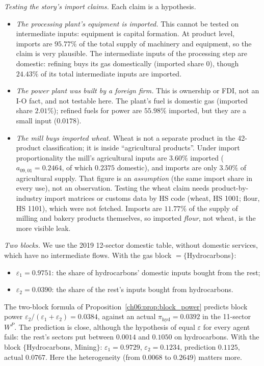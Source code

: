 \documentclass[../solutions_manual.tex]{subfiles}
\begin{document}
 \emph{Testing the story's import claims.} Each claim is a hypothesis.
\begin{itemize}
\item \emph{The processing plant's equipment is imported.} This cannot be tested on intermediate inputs: equipment is capital formation. At product level, imports are $95.77\%$ of the total supply of machinery and equipment, so the claim is very plausible. The intermediate inputs of the processing step are domestic: refining buys its gas domestically (imported share 0), though $24.43\%$ of its total intermediate inputs are imported.
\item \emph{The power plant was built by a foreign firm.} This is ownership or FDI, not an I-O fact, and not testable here. The plant's fuel is domestic gas (imported share $2.01\%$); refined fuels for power are $55.98\%$ imported, but they are a small input ($0.0178$).
\item \emph{The mill buys imported wheat.} Wheat is not a separate product in the 42-product classification; it is inside ``agricultural products''. Under import proportionality the mill's agricultural inputs are $3.60\%$ imported ($a_{09,01} = 0.2464$, of which $0.2375$ domestic), and imports are only $3.50\%$ of agricultural supply. That figure is an \emph{assumption} (the same import share in every use), not an observation. Testing the wheat claim needs product-by-industry import matrices or customs data by HS code (wheat, HS 1001; flour, HS 1101), which were not fetched. Imports are $11.77\%$ of the supply of milling and bakery products themselves, so imported \emph{flour}, not wheat, is the more visible leak.
\end{itemize}

 \emph{Two blocks.} We use the 2019 12-sector domestic table, without domestic services, which have no intermediate flows. With the gas block $= \{$Hydrocarbons$\}$:
\begin{itemize}
\item $\varepsilon_1 = 0.9751$: the share of hydrocarbons' domestic inputs bought from the rest;
\item $\varepsilon_2 = 0.0390$: the share of the rest's inputs bought from hydrocarbons.
\end{itemize}
The two-block formula of Proposition~\ref{ch06:prop:block_power} predicts block power $\varepsilon_2/(\varepsilon_1 + \varepsilon_2) = 0.0384$, against an actual $\pi_{\text{hyd}} = 0.0392$ in the 11-sector $W^P$. The prediction is close, although the hypothesis of equal $\varepsilon$ for every agent fails: the rest's sectors put between $0.0014$ and $0.1050$ on hydrocarbons. With the block $\{$Hydrocarbons, Mining$\}$: $\varepsilon_1 = 0.9729$, $\varepsilon_2 = 0.1234$, prediction $0.1125$, actual $0.0767$. Here the heterogeneity (from $0.0068$ to $0.2649$) matters more.
\end{document}
